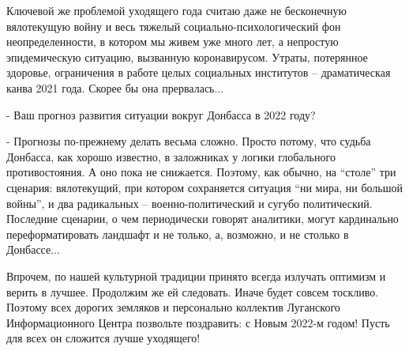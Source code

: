 Ключевой же проблемой уходящего года считаю даже не бесконечную вялотекущую
войну и весь тяжелый социально-психологический фон неопределенности, в котором
мы живем уже много лет, а непростую эпидемическую ситуацию, вызванную
коронавирусом. Утраты, потерянное здоровье, ограничения в работе целых
социальных институтов – драматическая канва 2021 года. Скорее бы она
прервалась...

- Ваш прогноз развития ситуации вокруг Донбасса в 2022 году?

- Прогнозы по-прежнему делать весьма сложно. Просто потому, что судьба
Донбасса, как хорошо известно, в заложниках у логики глобального
противостояния. А оно пока не снижается. Поэтому, как обычно, на \enquote{столе} три
сценария: вялотекущий, при котором сохраняется ситуация \enquote{ни мира, ни большой
войны}, и два радикальных – военно-политический и сугубо политический.
Последние сценарии, о чем периодически говорят аналитики, могут кардинально
переформатировать ландшафт и не только, а, возможно, и не столько в Донбассе...

Впрочем, по нашей культурной традиции принято всегда излучать оптимизм и верить
в лучшее. Продолжим же ей следовать. Иначе будет совсем тоскливо. Поэтому всех
дорогих земляков и персонально коллектив Луганского Информационного Центра
позвольте поздравить: с Новым 2022-м годом! Пусть для всех он сложится лучше
уходящего!
